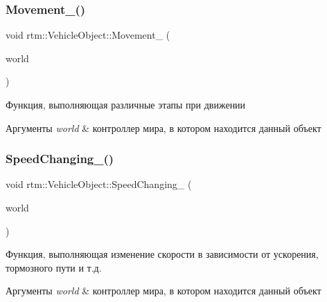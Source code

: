 \subsubsection{\texorpdfstring{Movement\+\_\+()}{Movement\_()}}
{\footnotesize\ttfamily void rtm\+::\+Vehicle\+Object\+::\+Movement\+\_\+ (\begin{DoxyParamCaption}\item[{\hyperlink{classrtm_1_1_world_controller}{World\+Controller} $\ast$const}]{world }\end{DoxyParamCaption})\hspace{0.3cm}{\ttfamily [private]}}

Функция, выполняющая различные этапы при движении 
\begin{DoxyParams}{Аргументы}
{\em world} & контроллер мира, в котором находится данный объект \\
\hline
\end{DoxyParams}
\mbox{\label{classrtm_1_1_vehicle_object_aee8f792a78b9b1becf7a84c01157520b}} 
\subsubsection{\texorpdfstring{Speed\+Changing\+\_\+()}{SpeedChanging\_()}}
{\footnotesize\ttfamily void rtm\+::\+Vehicle\+Object\+::\+Speed\+Changing\+\_\+ (\begin{DoxyParamCaption}\item[{\hyperlink{classrtm_1_1_world_controller}{World\+Controller} $\ast$const}]{world }\end{DoxyParamCaption})\hspace{0.3cm}{\ttfamily [private]}}

Функция, выполняющая изменение скорости в зависимости от ускорения, тормозного пути и т.\+д. 
\begin{DoxyParams}{Аргументы}
{\em world} & контроллер мира, в котором находится данный объект \\
\hline
\end{DoxyParams}
\mbox{\label{classrtm_1_1_vehicle_object_a76d76e5138ecb2188bb678a361ca58d7}} 
